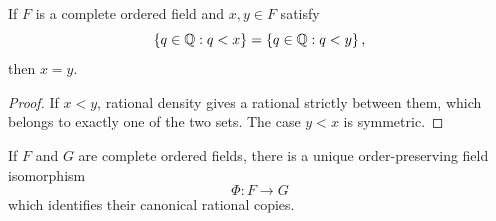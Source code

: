 \begin{lemma}
\label{lem:rational-cuts-determine-points}
If \(F\) is a complete ordered field and \(x,y\in F\) satisfy
\[
\left\{q\in\mathbb{Q}:q<x\right\}=\left\{q\in\mathbb{Q}:q<y\right\},
\]
then \(x=y\).
\end{lemma}
\begin{proof}
If \(x<y\), rational density gives a rational strictly between them, which
belongs to exactly one of the two sets.  The case \(y<x\) is symmetric.
\end{proof}

\begin{theorem}
\label{thm:unique-complete-ordered-field}
If \(F\) and \(G\) are complete ordered fields, there is a unique
order-preserving field isomorphism
\[
\Phi:F\longrightarrow G
\]
which identifies their canonical rational copies.
\end{theorem}
